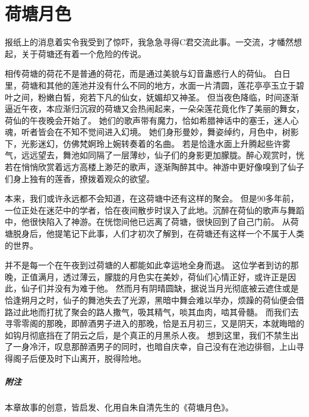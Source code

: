 \chapter{荷塘月色}

报纸上的消息着实令我受到了惊吓，我急急寻得C君交流此事。一交流，才幡然想起，关于荷塘还有着一个危险的传说。

相传荷塘的荷花不是普通的荷花，而是通过美貌与幻音蛊惑行人的荷仙。
白日里，荷塘和其他的莲池并没有什么不同的地方，水面一片清圆，莲花亭亭玉立于碧叶之间，粉嫩白皙，宛若下凡的仙女，妩媚却又神圣。
但当夜色降临，时间逐渐逼近午夜，本应渐归沉寂的荷塘又会热闹起来，一朵朵莲花竟化作了美丽的舞女，荷仙的午夜晚会开始了。
她们的歌声带有魔力，恰如希腊神话中的塞壬，迷人心魂，听者皆会在不知不觉间进入幻境。
她们身形曼妙，舞姿绰约，月色中，树影下，光影迷幻，仿佛梵婀玲上婉转奏着的名曲。
若是恰逢水面上升腾起些许雾气，远远望去，舞池如同隔了一层薄纱，仙子们的身影更加朦胧。醉心观赏时，恍若在悄悄欣赏着远方高楼上渺茫的歌声，逐渐陶醉其中。神游中更好像嗅到了仙子们身上独有的莲香，撩拨着观众的欲望。

本来，我们或许永远都不会知道，在这荷塘中还有这样的聚会。
但是90多年前，一位正处在迷茫中的学者，恰在夜间散步时误入了此地。沉醉在荷仙的歌声与舞蹈中，他很快陷入了神游。在恍惚间他已远离了荷塘，很快回到了自己门前。
从荷塘脱身后，他提笔记下此事，人们才初次了解到，在荷塘还有这样一个不属于人类的世界。

并不是每一个在午夜到过荷塘的人都能如此幸运地全身而退。
这位学者到访的那晚，正值满月，透过薄云，朦胧的月色实在美妙，荷仙们心情正好，或许正是因此，仙子们并没有为难于他。
然而月有阴晴圆缺，据说当月光彻底被云遮住或是恰逢朔月之时，仙子的舞池失去了光源，黑暗中舞会难以举办，烦躁的荷仙便会借路过此地而打扰了聚会的路人撒气，吸其精气，啖其血肉，啮其骨髓。
而我们去寻零零阁的那晚，即醉酒男子进入的那晚，恰是五月初三，又是阴天，本就晦暗的如钩月彻底挡在了阴云之后，是个真正的月黑杀人夜。
想到这里，我们不禁生出了一身冷汗，叹息那醉酒男子的同时，也暗自庆幸，自己没有在池边徘徊，上山寻得阁子后便及时下山离开，脱得险地。

\vfill

\paragraph{附注}
本章故事的创意，皆启发、化用自朱自清先生的《荷塘月色》。
